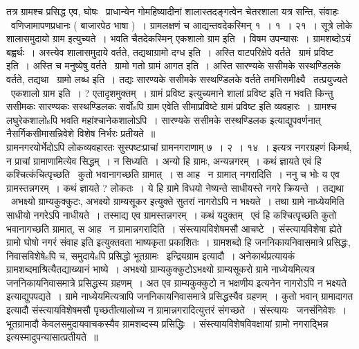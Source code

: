 \documentclass[11pt, openany]{book}
\begin{document}
{तत्र ग्रामश्च प्रसिद्ध एव, घोषः \textendash\ प्राधान्येन गोमहिष्यादीनां शालास्तदङ्गत्वेन चेतरशाला यत्र सन्ति, संवाहः \textendash\ वणिजामापणप्रधानः ( बाजारपेठ भाषा )~। ग्रामलक्षणं च आद्यन्तवदेकस्मिन् १~। १~। २१~। सूत्रे लोके शालासमुदायो ग्राम इत्युच्यते~। भवति चैतदेकस्मिन् एकशालो ग्राम इति~। विषम उपन्यासः~। ग्रामशब्दोऽयं बह्वर्थः~। अस्त्येव शालासमुदाये वर्तते, तद्यथाग्रामो दग्ध इति~। अस्ति वाटपरिक्षेपे वर्तते \textendash\ ग्रामं प्रविष्ट इति~। अस्ति च मनुष्येषु वर्तते \textendash\ ग्रामो गतो ग्रामं आगत इति~। अस्ति सारण्यके ससीमके सस्थण्डिलके वर्तते, तद्यथा \textendash\ ग्रामो लब्ध इति~। तद्यः सारण्यके ससीमके सस्थण्डिलके वर्तते तमभिसमीक्ष्यै \textendash\ तत्प्रयुज्यते \textendash\ एकशालो ग्राम इति~। ? एतादृशमुक्तम्~। ग्रामं प्रविष्ट इत्युच्यमाने शालां प्रविष्ट इति न भवति किन्तु ससीमकः सारण्यकः सस्थण्डिलकः सर्वोsपि ग्राम एवेति सीमाप्रविष्टे ग्रामं प्रविष्ट इति व्यवहारः~। ग्रामश्च लघुरेकशालोsपि भवति महांश्चानेकशालोऽपि~। सारण्यके ससीमके सस्थण्डिलक इत्याद्युपवर्णनात् नैसर्गिकसीमासन्निवेशे विशेष निर्भरः प्रतीयते~॥\\

ग्रामनगरयोर्भेदोऽपि लोकव्यवहारतः सुस्पष्टःप्राचां ग्रामनगराणाम् ७~। २~। १४~। इत्यत्र {\qt नगरग्रहणं किमर्थ, न प्राचां ग्रामाणामित्येव सिद्धम्~। न सिध्यति~। अन्यो हि ग्रामः, अन्यन्नगरम्~। कथं ज्ञायते एवं हि कश्चित्कंचित्पृच्छति \textendash\ कुतो भवानागच्छति ग्रामात्~। स आह \textendash\ न ग्रामात् नगरादिति~। ननु च भोः य एव ग्रामस्तन्नगरम्~। कथं ज्ञायते ? लोकतः~। ये हि ग्रामे विधयो नेष्यन्ते साधीयस्ते नगरे क्रियन्ते~। तद्यथा \textendash\ अभक्ष्यो ग्राम्यकुक्कुटः, अभक्ष्यो ग्राम्यसूकर इत्युक्ते सुतरां नागरोऽपि न भक्ष्यते~। तथा ग्रामे नाध्येयमिति साधीयो नगरेऽपि नाधीयते~। तस्माद्य एव ग्रामस्तन्नगरम्~। कथं यदुक्तम् \textendash\ एवं हि कश्चित्पृच्छति कुतो भवानागच्छति ग्रामात्, स आह \textendash\ न ग्रामान्नगरादिति~। संस्त्यायविशेषमसौ आचष्टे~। संस्त्यायविशेषा ह्येते ग्रामो घोषो नगरं संवाह इति} इत्युक्तवता भाष्यकृता प्रकाशितः~। ग्रामशब्दो हि जननिकायनिवासमात्रे प्रसिद्धः, निवासविशेषेsपि च, समुदायेsपि प्रसिद्धो भूतग्रामः \textendash\ इन्द्रियग्राम इत्यादौ~। अनेकार्थप्रत्यायकं ग्रामशब्दमाश्रित्यैतद्याख्यानं भाष्ये~। अभक्ष्यो ग्राम्यकुक्कुटोऽभक्ष्यो ग्राम्यसूकरो ग्रामे नाध्येयमित्यत्र जननिकायनिवासमात्रे प्रसिद्धस्य ग्रहणम्~। अत एव ग्राम्यकुक्कुटो न भक्षणीय इत्यनेन नागरोऽपि न भक्ष्यते इत्याद्युपपद्यते~। ग्रामे नाध्येयमित्यत्रापि जननिकायनिवासमात्रे प्रसिद्धस्यैव ग्रहणम्~। कुतो भवान् ग्रामादागत इत्यादौ संस्त्यायविशेषमसौ पृच्छतीत्यालोच्य न ग्रामान्नगरादित्युत्तरं संगच्छते~। संस्त्यायः \textendash\ जनसंनिवेशः~। भूतग्रामादौ केवलसमुदायवाचकस्यैव ग्रामशब्दस्य प्रसिद्धिः~। संस्त्यायविशेषविवक्षायां ग्रामो नगराद्भिन्न इत्यस्मादुपन्यासात्प्रतीयते~॥\\

}
\end{document}
